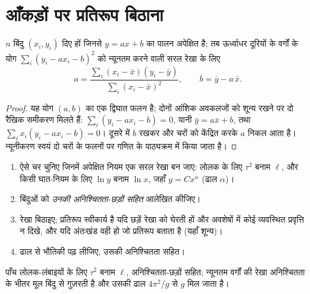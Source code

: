 \section{आँकड़ों पर प्रतिरूप बिठाना}

\begin{proposition}[न्यूनतम वर्गों की रेखा]\label{prop:b1:units-dimensions:regression}
$n$ बिंदु $(x_i, y_i)$ दिए हों जिनसे $y = a x + b$ का पालन अपेक्षित है; तब
ऊर्ध्वाधर दूरियों के वर्गों के योग $\sum_i (y_i - a x_i - b)^2$ को न्यूनतम
करने वाली सरल रेखा के लिए
\[
a = \frac{\sum_i (x_i - \bar x)(y_i - \bar y)}{\sum_i (x_i - \bar x)^2},
\qquad
b = \bar y - a\,\bar x .
\]
\end{proposition}

\begin{proof}
यह योग $(a, b)$ का एक द्विघात फलन है; दोनों आंशिक अवकलजों को शून्य रखने पर दो
रैखिक समीकरण मिलते हैं: $\sum_i (y_i - ax_i - b) = 0$, यानी
$\bar y = a \bar x + b$, तथा $\sum_i x_i (y_i - ax_i - b) = 0$। दूसरे में $b$
रखकर और चरों को केंद्रित करके $a$ निकल आता है। न्यूनीकरण स्वयं दो चरों के फलनों
पर गणित के पाठ्यक्रम में किया जाता है।
\end{proof}

\begin{method}[प्रतिरूप की आलेखीय जाँच]\label{met:b1:units-dimensions:fit}
\begin{enumerate}
  \item ऐसे चर चुनिए जिनमें अपेक्षित नियम एक सरल रेखा बन जाए: लोलक के लिए
        $\tau^2$ बनाम $\ell$, और किसी घात-नियम के लिए $\ln y$ बनाम
        $\ln x$, जहाँ $y = Cx^\alpha$ (ढाल $\alpha$)।
  \item बिंदुओं को \emph{उनकी अनिश्चितता-छड़ों सहित} आलेखित कीजिए।
  \item रेखा बिठाइए; प्रतिरूप स्वीकार्य है यदि छड़ें रेखा को घेरती हों और
        अवशेषों में कोई व्यवस्थित प्रवृत्ति न दिखे, और यदि अंतःखंड वही हो जो
        प्रतिरूप बताता है (यहाँ शून्य)।
  \item ढाल से भौतिकी पढ़ लीजिए, उसकी अनिश्चितता सहित।
\end{enumerate}
\end{method}

\begin{omfigure}

{\small पाँच लोलक-लंबाइयों के लिए $\tau^2$ बनाम $\ell$, अनिश्चितता-छड़ों
सहित; न्यूनतम वर्गों की रेखा अनिश्चितता के भीतर मूल बिंदु से गुज़रती है और
उसकी ढाल $4\pi^2/g$ से $g$ मिल जाता है।}
\end{omfigure}

